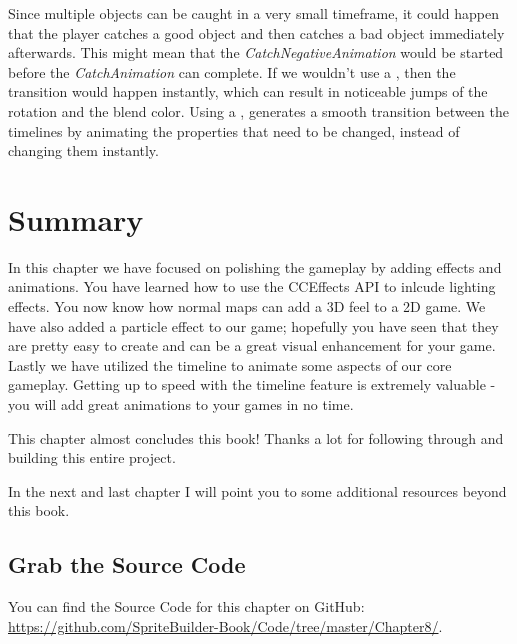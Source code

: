 Since multiple objects can be caught in a very small timeframe, it could happen
that the player catches a good object and then catches a bad object immediately
afterwards. This might mean that the \textit{CatchNegativeAnimation} would be
started before the \textit{CatchAnimation} can complete. If we wouldn't use a
, then the transition would happen instantly, which
can result in noticeable jumps of the rotation and the blend color. Using a
, \cocos{} generates a smooth transition between the 
timelines by animating the properties that need to be changed, instead of changing 
them instantly.

\section{Summary}

In this chapter we have focused on polishing the gameplay by adding effects and
animations. You have learned how to use the CCEffects API to inlcude lighting
effects. You now know how normal maps can add a 3D feel to a 2D game. We have
also added a particle effect to our game; hopefully you have seen that they are
pretty easy to create and can be a great visual enhancement for your game.
Lastly we have utilized the \SB{} timeline to animate some aspects of our core
gameplay. Getting up to speed with the timeline feature is extremely valuable -
you will add great animations to your games in no time.

This chapter almost concludes this book! Thanks a lot for following through and
building this entire project.

In the next and last chapter I will point you to some additional resources
beyond this book.

\subsection{Grab the Source Code}
You can find the Source Code for this chapter on GitHub:
\url{https://github.com/SpriteBuilder-Book/Code/tree/master/Chapter8/}.
